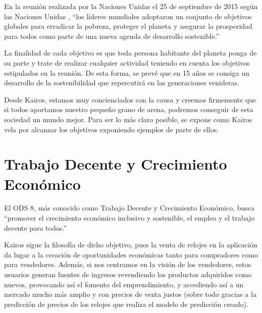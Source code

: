 
%
%

	En la reunión realizada por la Naciones Unidas el 25 de septiembre de 2015 según las Naciones Unidas \cite{ods}, ``los líderes mundiales adoptaron un conjunto de objetivos globales para erradicar la pobreza, proteger el planeta y asegurar la prosperidad para todos como parte de una nueva agenda de desarrollo sostenible.''
	
	La finalidad de cada objetivo es que toda persona habitante del planeta ponga de su parte y trate de realizar cualquier actividad teniendo en cuenta los objetivos estipulados en la reunión. De esta forma, se prevé que en 15 años se consiga un desarrollo de la sostenibilidad que repercutirá en las generaciones venideras.
	
	Desde Kairos, estamos muy concienciados con la causa y creemos firmemente que si todos aportamos nuestro pequeño grano de arena, podremos conseguir de esta sociedad un mundo mejor. Para ser lo más claro posible, se expone como Kairos vela por alcanzar los objetivos exponiendo ejemplos de parte de ellos.
	
\section{Trabajo Decente y Crecimiento Económico}

	El ODS 8, más conocido como Trabajo Decente y Crecimiento Económico, busca ``promover el crecimiento económico inclusivo y sostenible, el empleo y el trabajo decente para todos.''
	
	Kairos sigue la filosofía de dicho objetivo, pues la venta de relojes en la aplicación da lugar a la creación de oportunidades económicas tanto para compradores como para vendedores. Además, si nos centramos en la visión de los vendedores, estos usuarios generan fuentes de ingresos revendiendo los productos adquiridos como nuevos, provocando así el fomento del emprendimiento, y accediendo así a un mercado mucho más amplio y con precios de venta justos (sobre todo gracias a la predicción de precios de los relojes que realiza el modelo de predicción creado).
	

